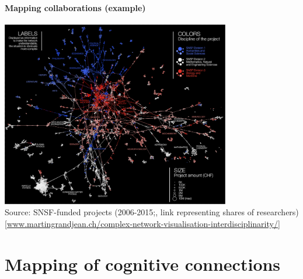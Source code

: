 \documentclass[8pt]{beamer}
\begin{document}
\begin{frame}
\frametitle{\insertsection}
\framesubtitle{Mapping collaborations (example)}

\centering
\includegraphics[width= 0.75\textwidth]{snf.png}\\
\tiny Source: SNSF-funded projects (2006-2015;, link representing shares of researchers) [\url{www.martingrandjean.ch/complex-network-visualisation-interdisciplinarity/}]

\end{frame}




\section{Mapping of cognitive connections}

\bgroup
{}
\begin{frame}[plain]{}
\begin{center}
\color{white}{\Huge\insertsection}
\end{center}
\end{frame}
\egroup

\end{document}
